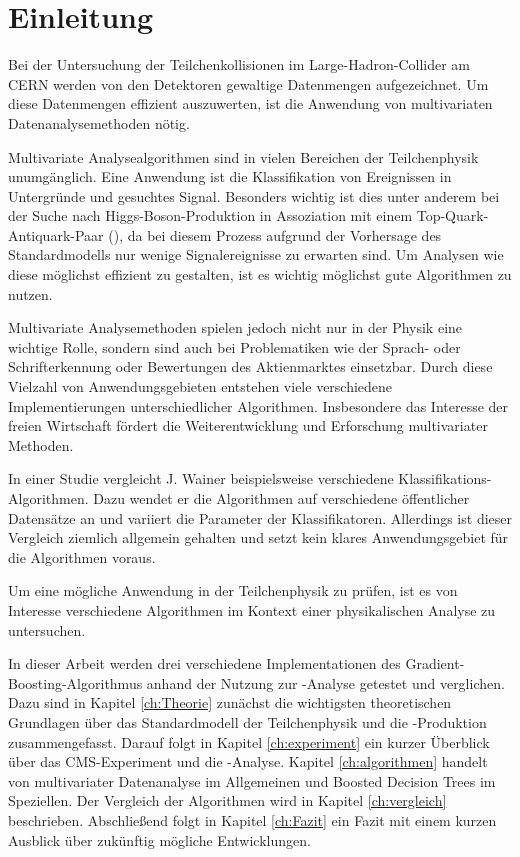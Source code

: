 
\chapter{Einleitung}
\label{ch:Einleitung}

{}

Bei der Untersuchung der Teilchenkollisionen im Large-Hadron-Collider am CERN werden von den Detektoren gewaltige Datenmengen aufgezeichnet. Um diese Datenmengen effizient auszuwerten, ist die Anwendung von multivariaten Datenanalysemethoden n\"otig.

Multivariate Analysealgorithmen sind in vielen Bereichen der Teilchenphysik unumg\"anglich. Eine Anwendung ist die Klassifikation von Ereignissen in Untergr\"unde und gesuchtes Signal. Besonders wichtig ist dies unter anderem bei der Suche nach Higgs-Boson-Produktion in Assoziation mit einem Top-Quark-Antiquark-Paar (\ttH), da bei diesem Prozess aufgrund der Vorhersage des Standardmodells nur wenige Signalereignisse zu erwarten sind. Um Analysen wie diese m\"oglichst effizient zu gestalten, ist es wichtig m\"oglichst gute Algorithmen zu nutzen.

Multivariate Analysemethoden spielen jedoch nicht nur in der Physik eine wichtige Rolle, sondern sind auch bei Problematiken wie der Sprach- oder Schrifterkennung oder Bewertungen des Aktienmarktes einsetzbar. Durch diese Vielzahl von Anwendungsgebieten entstehen viele verschiedene Implementierungen unterschiedlicher Algorithmen. Insbesondere das Interesse der freien Wirtschaft f\"ordert die Weiterentwicklung und Erforschung multivariater Methoden.

In einer Studie vergleicht J. Wainer \cite{DBLP:journals/corr/Wainer16} beispielsweise verschiedene Klassifikations-Algorithmen. Dazu wendet er die Algorithmen auf verschiedene \"offentlicher Datens\"atze an und variiert die Parameter der Klassifikatoren. Allerdings ist dieser Vergleich ziemlich allgemein gehalten und setzt kein klares Anwendungsgebiet f\"ur die Algorithmen voraus.

Um eine m\"ogliche Anwendung in der Teilchenphysik zu pr\"ufen, ist es von Interesse verschiedene Algorithmen im Kontext einer physikalischen Analyse zu untersuchen.

In dieser Arbeit werden drei verschiedene Implementationen des Gradient-Boosting-Algorithmus anhand der Nutzung zur \ttH-Analyse getestet und verglichen. Dazu sind in Kapitel \ref{ch:Theorie} zun\"achst die wichtigsten theoretischen Grundlagen \"uber das Standardmodell der Teilchenphysik und die \ttH-Produktion zusammengefasst. Darauf folgt in Kapitel \ref{ch:experiment} ein kurzer \"Uberblick \"uber das CMS-Experiment und die \ttH-Analyse. Kapitel \ref{ch:algorithmen} handelt von multivariater Datenanalyse im Allgemeinen und Boosted Decision Trees im Speziellen. Der Vergleich der Algorithmen wird in Kapitel \ref{ch:vergleich} beschrieben. Abschlie\ss end folgt in Kapitel \ref{ch:Fazit} ein Fazit mit einem kurzen Ausblick \"uber zuk\"unftig m\"ogliche Entwicklungen.